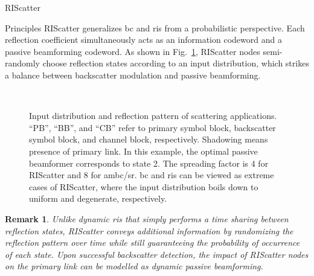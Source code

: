 \documentclass[journal]{IEEEtran}
\newtheorem{remark}{Remark}
\begin{document}
\begin{section}{RIScatter}
\begin{subsection}{Principles}
		RIScatter generalizes \gls{bc} and \gls{ris} from a probabilistic perspective.
		Each reflection coefficient simultaneously acts as an information codeword and a passive beamforming codeword.
		As shown in Fig.~\ref{fg:scatter_comparison}, RIScatter nodes semi-randomly choose reflection states according to an input distribution, which strikes a balance between backscatter modulation and passive beamforming.
		\begin{figure}[!t]
			\centering
			\\
			\caption{
				Input distribution and reflection pattern of scattering applications.
				``PB'', ``BB'', and ``CB'' refer to primary symbol block, backscatter symbol block, and channel block, respectively.
				Shadowing means presence of primary link.
				In this example, the optimal passive beamformer corresponds to state \num{2}.
				The spreading factor is \num{4} for RIScatter and \num{8} for \gls{ambc}/\gls{sr}.
				\gls{bc} and \gls{ris} can be viewed as extreme cases of RIScatter, where the input distribution boils down to uniform and degenerate, respectively.
			}
			\label{fg:scatter_comparison}
		\end{figure}
		\begin{remark}
			Unlike dynamic \gls{ris} that simply performs a time sharing between reflection states, RIScatter conveys additional information by randomizing the reflection pattern over time while still guaranteeing the probability of occurrence of each state.
			Upon successful backscatter detection, the impact of RIScatter nodes on the primary link can be modelled as dynamic passive beamforming.
		\end{remark}


\end{subsection}
\end{section}
\end{document}
